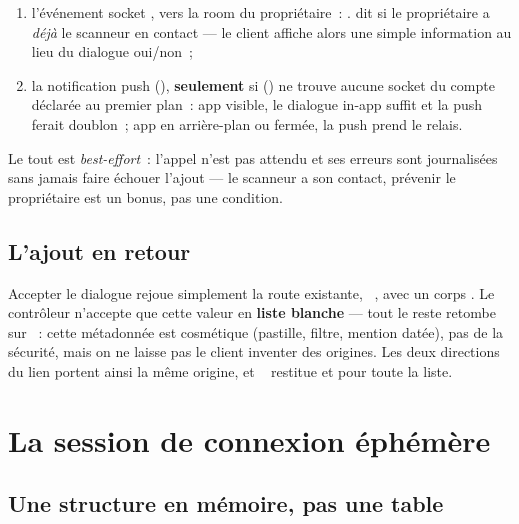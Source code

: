 \begin{enumerate}[leftmargin=1.6em]
  \item l'événement socket \textbf{}, vers la room
         du propriétaire~: .  dit si le
        propriétaire a \emph{déjà} le scanneur en contact --- le client affiche alors une
        simple information au lieu du dialogue oui/non~;
  \item la notification push 
        (),
        \textbf{seulement} si  () ne trouve aucune socket du compte déclarée au premier
        plan~: app visible, le dialogue in-app suffit et la push ferait doublon~; app en
        arrière-plan ou fermée, la push prend le relais.
\end{enumerate}

Le tout est \emph{best-effort}~: l'appel n'est pas attendu et ses erreurs sont
journalisées sans jamais faire échouer l'ajout --- le scanneur a son contact, prévenir
le propriétaire est un bonus, pas une condition.

\section{L'ajout en retour}

Accepter le dialogue rejoue simplement la route existante,
\mPOST{}~, avec un corps . Le contrôleur
n'accepte que cette valeur en \textbf{liste blanche} --- tout le reste retombe sur
~: cette métadonnée est cosmétique (pastille, filtre, mention datée), pas
de la sécurité, mais on ne laisse pas le client inventer des origines. Les deux
directions du lien portent ainsi la même origine, et \mGET{}~
restitue  et  pour toute la liste.

\chapter{La session de connexion éphémère}
\label{ch:qr-ephemere}

\section{Une structure en mémoire, pas une table}

